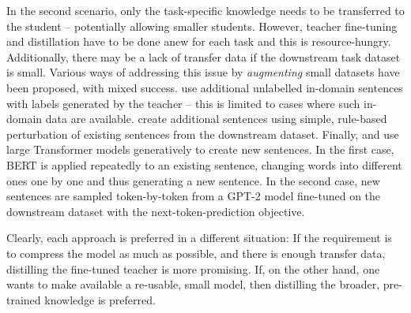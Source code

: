 \documentclass[bsc,frontabs,singlespacing,parskip,deptreport]{infthesis}
\begin{document}
{{{      %

      In the second scenario, only the task-specific knowledge needs to be transferred to the student -- potentially allowing smaller students.
      However, teacher fine-tuning and distillation have to be done anew for each task and this is resource-hungry.
      Additionally, there may be a lack of transfer data if the downstream task dataset is small.
      Various ways of addressing this issue by \textit{augmenting} small datasets have been proposed, with mixed success. 
      \citet{Mukherjee_2019} use additional unlabelled in-domain sentences with labels generated by the teacher -- this is limited to cases where such in-domain data are available. \citet{Tang_2019a} create additional sentences using simple, rule-based perturbation of existing sentences from the downstream dataset. Finally, \citet{Jiao_2019} and \citet{Tang_2019b} use large Transformer models generatively to create new sentences. In the first case, BERT is applied repeatedly to an existing sentence, changing words into different ones one by one and thus generating a new sentence. In the second case, new sentences are sampled token-by-token from a GPT-2 model fine-tuned on the downstream dataset with the next-token-prediction objective.

      Clearly, each approach is preferred in a different situation: If the requirement is to compress the model as much as possible, and there is enough transfer data, distilling the fine-tuned teacher is more promising. If, on the other hand, one wants to make available a re-usable, small model, then distilling the broader, pre-trained knowledge is preferred.
    }
  }
  
}
\end{document}
